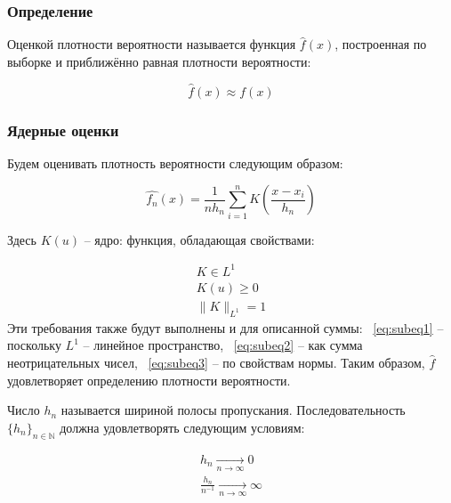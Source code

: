 \subsubsection{Определение}

Оценкой плотности вероятности называется функция $\hat{f}(x)$, построенная по выборке и приближённо равная плотности вероятности:

\begin{equation}
\hat{f}(x) \approx f(x)
\end{equation}

\subsubsection{Ядерные оценки}

Будем оценивать плотность вероятности следующим образом:

\begin{equation}
\hat{f_n}(x) = \displaystyle \frac{1}{nh_n}\sum_{i=1}^{n}{K\left(\frac{x - x_i}{h_n}\right)}
\end{equation}

Здесь $K(u)$ -- ядро: функция, обладающая свойствами:

\begin{subequations}\label{eq:subeqns}
\begin{align}
	K \in L^1 \label{eq:subeq1} \\
	K(u) \geq 0 \label{eq:subeq2} \\
	\|K\|_{L^1}=1 \label{eq:subeq3}
\end{align}
\end{subequations}
Эти требования также будут выполнены и для описанной суммы: ~\eqref{eq:subeq1} -- поскольку $L^1$ -- линейное пространство, ~\eqref{eq:subeq2} -- как сумма неотрицательных чисел, ~\eqref{eq:subeq3} -- по свойствам нормы. Таким образом, $\hat{f}$ удовлетворяет определению плотности вероятности.

Число $h_n$ называется шириной полосы пропускания.
Последовательность $\{h_n\}_{n \in \mathbb{N}}$ должна удовлетворять следующим условиям:

\begin{subequations}\label{eq:subeqns}
\begin{align}
	h_n \underset{n \rightarrow \infty}{\longrightarrow} 0\\%
	\frac{h_n}{n^{-1}} \underset{n \rightarrow \infty}{\longrightarrow} \infty%
\end{align}
\end{subequations}

